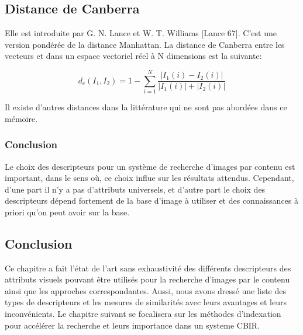 \subsection{Distance de Canberra}
Elle est introduite par G. N. Lance et W. T. Williams [Lance 67]. C'est une version
pondérée de la distance Manhattan. La distance de Canberra entre les vecteurs et dans un espace vectoriel réel à N dimensions est la suivante:

\begin{equation}
	d_c(I_1, I_2) = 1- \sum_{i=1}^{N}   \frac{\left|{I}_{1}(i)-{I}_{2}(i)\right|}{\left|{I}_{1}(i)\right| + \left|{I}_{2}(i)\right|}
\end{equation}


Il existe d’autres distances dans la littérature qui ne sont pas abordées dans ce mémoire.

\subsubsection{Conclusion}
Le choix des descripteurs pour un système de recherche d'images par contenu est important,
dans le sens où, ce choix influe sur les résultats attendus. Cependant, d'une part il n'y a pas
d'attributs universels, et d'autre part le choix des descripteurs dépend fortement de la base
d'image à utiliser et des connaissances à priori qu'on peut avoir sur la base.
\subsection{Conclusion}
Ce chapitre a fait l’état de l’art sans exhaustivité des différents descripteurs des attributs visuels pouvant être utilisés pour la recherche d’images par le contenu ainsi que les approches correspondantes. Aussi, nous avons dressé une liste des types de descripteurs et les mesures de similarités avec leurs avantages et leurs inconvénients. Le chapitre suivant se focalisera sur les méthodes d'indexation pour accélérer la recherche et leurs importance dans un systeme CBIR.